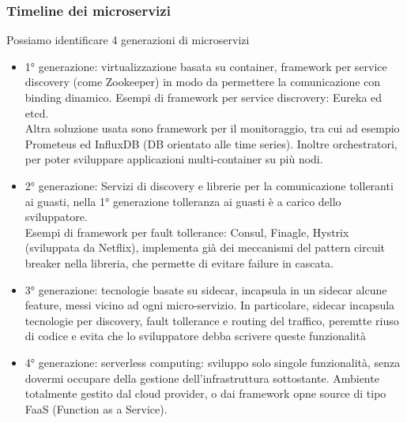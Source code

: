 \documentclass[16px]{article}
\begin{document}
\subsubsection{Timeline dei microservizi}
Possiamo identificare 4 generazioni di microservizi
\begin{itemize}
\item 1° generazione: virtualizzazione basata su container, framework per service discovery (come Zookeeper) in modo da permettere la comunicazione con binding dinamico. Esempi di framework per service discrovery: Eureka ed etcd.\\ Altra soluzione usata sono framework per il monitoraggio, tra cui ad esempio Prometeus ed InfluxDB (DB orientato alle time series). Inoltre orchestratori, per poter sviluppare applicazioni multi-container su più nodi.
\item 2° generazione: Servizi di discovery e librerie per la comunicazione tolleranti ai guasti, nella 1° generazione tolleranza ai guasti è a carico dello sviluppatore.\\ Esempi di framework per fault tollerance: Consul, Finagle, Hystrix (sviluppata da Netflix), implementa già dei meccanismi del pattern circuit breaker nella libreria, che permette di evitare failure in cascata.
\item 3° generazione: tecnologie basate su sidecar, incapsula in un sidecar alcune feature, messi vicino ad ogni micro-servizio. In particolare, sidecar incapsula tecnologie per discovery, fault tollerance e routing del traffico, peremtte riuso di codice e evita che lo sviluppatore debba scrivere queste funzionalità
\item 4° generazione: serverless computing: sviluppo solo singole funzionalità, senza dovermi occupare della gestione dell'infrastruttura sottostante. Ambiente totalmente gestito dal cloud provider, o dai framework opne source di tipo FaaS (Function as a Service).
\end{itemize}
\end{document}
